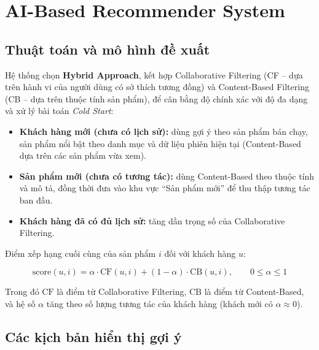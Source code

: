 \documentclass[12pt,a4paper,oneside]{report}
\begin{document}
\section{AI-Based Recommender System}

\subsection{Thuật toán và mô hình đề xuất}

Hệ thống chọn \textbf{Hybrid Approach}, kết hợp Collaborative Filtering (CF -- dựa trên hành vi của người dùng có sở thích tương đồng) và Content-Based Filtering (CB -- dựa trên thuộc tính sản phẩm), để cân bằng độ chính xác với độ đa dạng và xử lý bài toán \emph{Cold Start}:

\begin{itemize}
  \item \textbf{Khách hàng mới (chưa có lịch sử):} dùng gợi ý theo sản phẩm bán chạy, sản phẩm nổi bật theo danh mục và dữ liệu phiên hiện tại (Content-Based dựa trên các sản phẩm vừa xem).
  \item \textbf{Sản phẩm mới (chưa có tương tác):} dùng Content-Based theo thuộc tính và mô tả, đồng thời đưa vào khu vực ``Sản phẩm mới'' để thu thập tương tác ban đầu.
  \item \textbf{Khách hàng đã có đủ lịch sử:} tăng dần trọng số của Collaborative Filtering.
\end{itemize}

Điểm xếp hạng cuối cùng của sản phẩm $i$ đối với khách hàng $u$:

\begin{equation}
\text{score}(u,i) = \alpha \cdot \text{CF}(u,i) + (1-\alpha) \cdot \text{CB}(u,i), \qquad 0 \le \alpha \le 1
\end{equation}

Trong đó $\text{CF}$ là điểm từ Collaborative Filtering, $\text{CB}$ là điểm từ Content-Based, và hệ số $\alpha$ tăng theo số lượng tương tác của khách hàng (khách mới có $\alpha \approx 0$).

\subsection{Các kịch bản hiển thị gợi ý}
\end{document}

